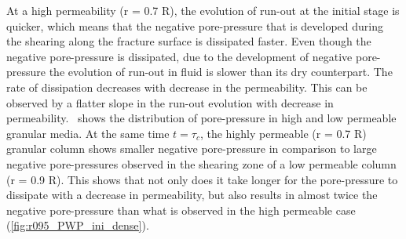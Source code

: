 At a high permeability (r = 0.7 R), the evolution of run-out at the initial 
stage is quicker, which means that the negative pore-pressure that is developed 
during the shearing along the fracture surface is dissipated faster. Even 
though the negative pore-pressure is dissipated, due to 
the development of negative pore-pressure the evolution of run-out in fluid is 
slower than its dry counterpart. The rate of dissipation decreases with 
decrease in the permeability. This can be observed by a flatter slope in the 
run-out evolution with decrease in permeability.~ shows 
the distribution of pore-pressure in high and low permeable granular media. At 
the same time $ t = \tau_c$, the highly permeable (r = 0.7 R) granular column 
shows smaller 
negative pore-pressure in comparison to large negative pore-pressures observed 
in the shearing zone of a low permeable column (r = 0.9 R). This shows that not 
only does it take longer for the pore-pressure to dissipate with a decrease 
in permeability, but also results in almost twice the negative pore-pressure 
than what is observed in the high permeable case 
(\cref{fig:r095_PWP_ini_dense}).

